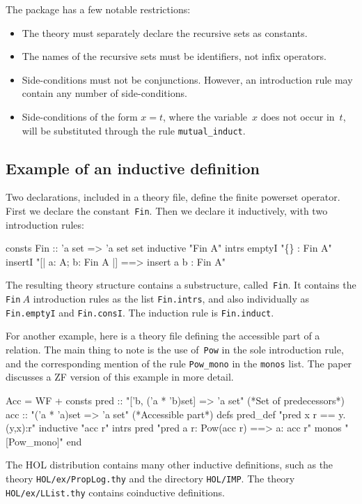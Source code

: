 The package has a few notable restrictions:
\begin{itemize}
\item The theory must separately declare the recursive sets as
  constants.

\item The names of the recursive sets must be identifiers, not infix
operators.  

\item Side-conditions must not be conjunctions.  However, an introduction rule
may contain any number of side-conditions.

\item Side-conditions of the form $x=t$, where the variable~$x$ does not
  occur in~$t$, will be substituted through the rule \verb|mutual_induct|.
\end{itemize}


\subsection{Example of an inductive definition}
Two declarations, included in a theory file, define the finite powerset
operator.  First we declare the constant~{\tt Fin}.  Then we declare it
inductively, with two introduction rules:
\begin{ttbox}
consts Fin :: 'a set => 'a set set
inductive "Fin A"
  intrs
    emptyI  "\{\} : Fin A"
    insertI "[| a: A;  b: Fin A |] ==> insert a b : Fin A"
\end{ttbox}
The resulting theory structure contains a substructure, called~{\tt Fin}.
It contains the {\tt Fin}$~A$ introduction rules as the list {\tt Fin.intrs},
and also individually as {\tt Fin.emptyI} and {\tt Fin.consI}.  The induction
rule is {\tt Fin.induct}.

For another example, here is a theory file defining the accessible part of a
relation.  The main thing to note is the use of~{\tt Pow} in the sole
introduction rule, and the corresponding mention of the rule
\verb|Pow_mono| in the {\tt monos} list.  The paper discusses a ZF version
of this example in more detail.
\begin{ttbox}
Acc = WF + 
consts pred :: "['b, ('a * 'b)set] => 'a set"   (*Set of predecessors*)
       acc  :: "('a * 'a)set => 'a set"         (*Accessible part*)
defs   pred_def  "pred x r == {y. (y,x):r}"
inductive "acc r"
  intrs
     pred "pred a r: Pow(acc r) ==> a: acc r"
  monos   "[Pow_mono]"
end
\end{ttbox}
The HOL distribution contains many other inductive definitions, such as the
theory {\tt HOL/ex/PropLog.thy} and the directory {\tt HOL/IMP}.  The
theory {\tt HOL/ex/LList.thy} contains coinductive definitions.

